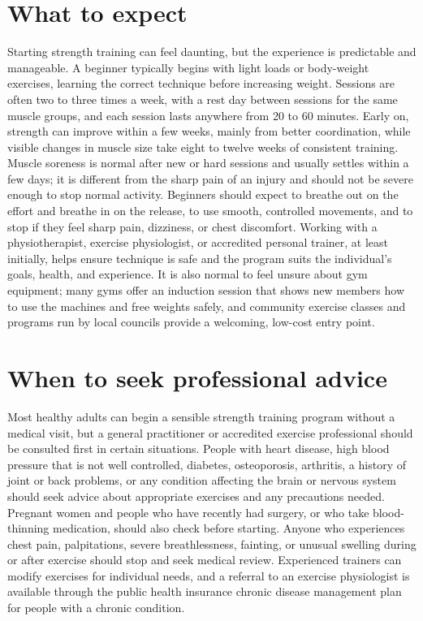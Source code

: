 \section*{What to expect}
Starting strength training can feel daunting, but the experience is predictable and manageable. A beginner typically begins with light loads or body-weight exercises, learning the correct technique before increasing weight. Sessions are often two to three times a week, with a rest day between sessions for the same muscle groups, and each session lasts anywhere from 20 to 60 minutes. Early on, strength can improve within a few weeks, mainly from better coordination, while visible changes in muscle size take eight to twelve weeks of consistent training. Muscle soreness is normal after new or hard sessions and usually settles within a few days; it is different from the sharp pain of an injury and should not be severe enough to stop normal activity. Beginners should expect to breathe out on the effort and breathe in on the release, to use smooth, controlled movements, and to stop if they feel sharp pain, dizziness, or chest discomfort. Working with a physiotherapist, exercise physiologist, or accredited personal trainer, at least initially, helps ensure technique is safe and the program suits the individual's goals, health, and experience. It is also normal to feel unsure about gym equipment; many gyms offer an induction session that shows new members how to use the machines and free weights safely, and community exercise classes and programs run by local councils provide a welcoming, low-cost entry point.

\section*{When to seek professional advice}
Most healthy adults can begin a sensible strength training program without a medical visit, but a general practitioner or accredited exercise professional should be consulted first in certain situations. People with heart disease, high blood pressure that is not well controlled, diabetes, osteoporosis, arthritis, a history of joint or back problems, or any condition affecting the brain or nervous system should seek advice about appropriate exercises and any precautions needed. Pregnant women and people who have recently had surgery, or who take blood-thinning medication, should also check before starting. Anyone who experiences chest pain, palpitations, severe breathlessness, fainting, or unusual swelling during or after exercise should stop and seek medical review. Experienced trainers can modify exercises for individual needs, and a referral to an exercise physiologist is available through the public health insurance chronic disease management plan for people with a chronic condition.

